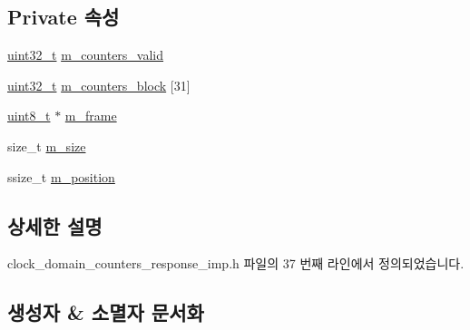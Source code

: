 \subsection*{Private 속성}
\begin{DoxyCompactItemize}
\item 
\hyperlink{parse_8c_a6eb1e68cc391dd753bc8ce896dbb8315}{uint32\+\_\+t} \hyperlink{classavdecc__lib_1_1clock__domain__counters__response__imp_ab528aa8ed91b0a6453238e605c451ce8}{m\+\_\+counters\+\_\+valid}
\item 
\hyperlink{parse_8c_a6eb1e68cc391dd753bc8ce896dbb8315}{uint32\+\_\+t} \hyperlink{classavdecc__lib_1_1clock__domain__counters__response__imp_a4280ad18b84e17884a0eca22237e22a9}{m\+\_\+counters\+\_\+block} \mbox{[}31\mbox{]}
\item 
\hyperlink{stdint_8h_aba7bc1797add20fe3efdf37ced1182c5}{uint8\+\_\+t} $\ast$ \hyperlink{classavdecc__lib_1_1clock__domain__counters__response__imp_a50417969cf438e7c8d698726bbbe2ff9}{m\+\_\+frame}
\item 
size\+\_\+t \hyperlink{classavdecc__lib_1_1clock__domain__counters__response__imp_a0dc3c363255f193681c77b4d2a82e995}{m\+\_\+size}
\item 
ssize\+\_\+t \hyperlink{classavdecc__lib_1_1clock__domain__counters__response__imp_af5e691c4a8a0feb07f48440b321206cd}{m\+\_\+position}
\end{DoxyCompactItemize}


\subsection{상세한 설명}


clock\+\_\+domain\+\_\+counters\+\_\+response\+\_\+imp.\+h 파일의 37 번째 라인에서 정의되었습니다.



\subsection{생성자 \& 소멸자 문서화}
